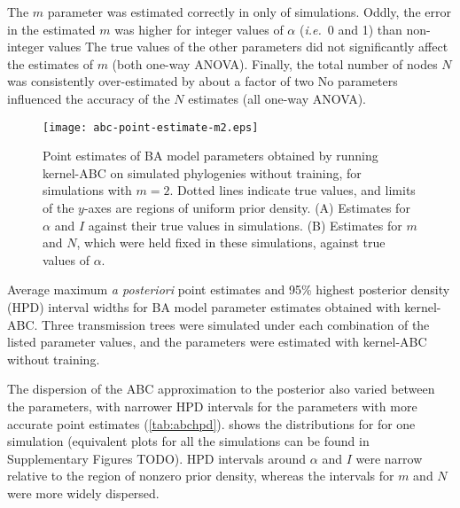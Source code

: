 \documentclass[12pt]{article}\usepackage[]{graphicx}\usepackage[]{color}
\begin{document}
The $m$ parameter was estimated correctly in only
of simulations. Oddly, the error in the estimated $m$ was higher for integer
values of $\alpha$ (\textit{i.e.}~0 and 1) than non-integer values 
The true values of the other parameters did not significantly affect the
estimates of $m$ (both one-way ANOVA). Finally, the total number of nodes $N$
was consistently over-estimated by about a factor of two
No parameters influenced the accuracy of the $N$ estimates (all one-way ANOVA).

\begin{figure*}[ht]
  \centering
  \texttt{[image: abc-point-estimate-m2.eps]}
  \vspace{6pt}
  \caption{
    Point estimates of BA model parameters obtained by running kernel-ABC
    on simulated phylogenies without training, for simulations with $m = 2$.
    Dotted lines indicate true values, and limits of the $y$-axes are regions
    of uniform prior density. (A) Estimates for $\alpha$ and $I$ against their
    true values in simulations. (B) Estimates for $m$ and $N$, which were held
    fixed in these simulations, against true values of $\alpha$.
  }
  \label{fig:abcpt}
\end{figure*}

\begin{table*}[ht]
  \centering
  
  \caption{
      Average maximum \textit{a posteriori} point estimates and 95\% highest
      posterior density (HPD) interval widths for BA model parameter estimates
      obtained with kernel-ABC. Three transmission trees were simulated under
      each combination of the listed parameter values, and the parameters were
      estimated with kernel-ABC without training.
  }
  \label{tab:abchpd}
\end{table*}

The dispersion of the ABC approximation to the posterior also varied between
the parameters, with narrower HPD intervals for the parameters with more
accurate point estimates (\cref{tab:abchpd}).  shows
the distributions for for one simulation (equivalent plots for all the
simulations can be found in Supplementary Figures TODO). HPD intervals around
$\alpha$ and $I$ were narrow relative to the region of nonzero prior density,
whereas the intervals for $m$ and $N$ were more widely dispersed.
\end{document}
